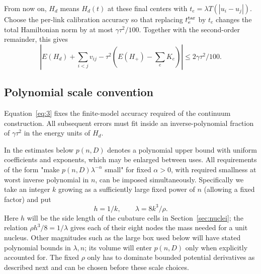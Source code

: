 From now on, \(H_d\) means \(H_d(t)\) at these final centers with
\(t_e=\lambda T(|u_i-u_j|)\). Choose the per-link calibration accuracy
so that replacing \(t_e^{\rm tar}\) by \(t_e\) changes the total
Hamiltonian norm by at most \(\gamma\tau^2/100\). Together with the
second-order remainder, this gives
\[
  |E(H_d)+\sum_{i<j}v_{ij}
       -\tau^2(E(H_+)-\sum_e K_e)|\le 2\gamma\tau^2/100.       \tag{3}\label{eq:3}
\]

\subsection{Polynomial scale convention}\label{subsec:scales}

Equation~\eqref{eq:3} fixes the finite-model accuracy required of the
continuum construction. All subsequent errors must fit inside an
inverse-polynomial fraction of $\gamma\tau^2$ in the energy units of
$H_d$.

In the estimates below \(p(n,D)\) denotes a polynomial upper bound with uniform coefficients and exponents, which may be enlarged between uses. All requirements of the form "make \(p(n,D)\lambda^{-\alpha}\) small" for fixed \(\alpha>0\), with required smallness at worst inverse polynomial in \(n\), can be imposed simultaneously. Specifically we take an integer \(k\) growing as a sufficiently large fixed power of \(n\) (allowing a fixed factor) and put
\[
                  h=1/k,\qquad \lambda=8k^3/\rho .
\]
Here \(h\) will be the side length of the cubature cells in
Section~\ref{sec:nuclei}; the relation
\(\rho h^3/8=1/\lambda\) gives each of their eight nodes the mass
needed for a unit nucleus. Other magnitudes such as the large box used
below will have stated polynomial bounds in \(\lambda,n\); its volume
will enter \(p(n,D)\) only when explicitly accounted for. The fixed
\(\rho\) only has to dominate bounded potential derivatives as described
next and can be chosen before these scale choices.
